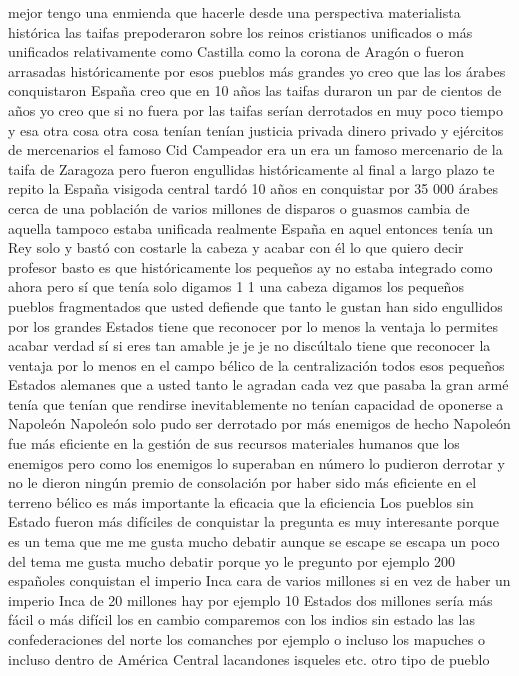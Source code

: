 mejor tengo una enmienda que hacerle desde una perspectiva materialista histórica las taifas
prepoderaron sobre los reinos cristianos unificados o más unificados relativamente como Castilla
como la corona de Aragón o fueron arrasadas históricamente por esos pueblos más grandes yo creo que las
los árabes conquistaron España creo que en 10 años las taifas duraron un par de cientos de años
yo creo que si no fuera por las taifas serían derrotados en muy poco tiempo y esa otra cosa otra cosa tenían
tenían justicia privada dinero privado y ejércitos de mercenarios el famoso Cid Campeador era un
era un famoso mercenario de la taifa de Zaragoza pero fueron engullidas históricamente al final a largo plazo
te repito la España visigoda central tardó 10 años en conquistar por 35 000 árabes
cerca de una población de varios millones de disparos o guasmos cambia de aquella tampoco estaba unificada realmente España en aquel entonces
tenía un Rey solo y bastó con costarle la cabeza y acabar con él lo que quiero decir profesor basto
es que históricamente los pequeños ay no estaba integrado como ahora pero sí que tenía solo digamos 1 1
una cabeza digamos los pequeños pueblos fragmentados que usted defiende que tanto le gustan han sido engullidos por los grandes Estados
tiene que reconocer por lo menos la ventaja lo permites acabar verdad
sí si eres tan amable je je je no discúltalo tiene que reconocer la ventaja
por lo menos en el campo bélico de la centralización todos esos pequeños Estados alemanes
que a usted tanto le agradan cada vez que pasaba la gran armé tenía que tenían que rendirse inevitablemente no tenían capacidad de oponerse a Napoleón
Napoleón solo pudo ser derrotado por más enemigos de hecho Napoleón fue más eficiente en la gestión de sus recursos
materiales humanos que los enemigos pero como los enemigos lo superaban en número lo pudieron derrotar y no le dieron ningún premio de consolación
por haber sido más eficiente en el terreno bélico es más importante la eficacia que la eficiencia
Los pueblos sin Estado fueron más difíciles de conquistar
la pregunta es muy interesante porque es un tema que me me gusta mucho debatir aunque se escape se escapa un poco del tema
me gusta mucho debatir porque yo le pregunto por ejemplo 200 españoles conquistan el imperio Inca cara de varios millones
si en vez de haber un imperio Inca de 20 millones hay por ejemplo 10 Estados dos millones sería más fácil o más difícil
los en cambio comparemos con los indios sin estado las las confederaciones del norte los comanches por ejemplo
o incluso los mapuches o incluso dentro de América Central lacandones isqueles etc. otro tipo de pueblo
